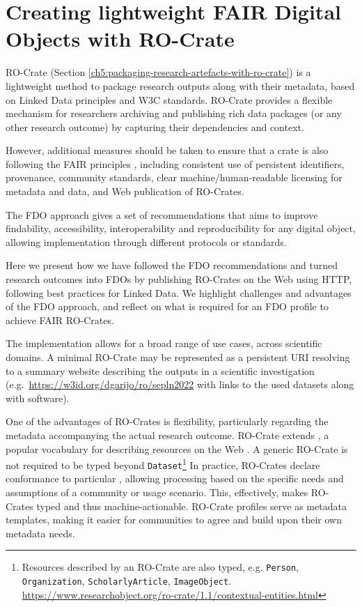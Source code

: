 \section{Creating lightweight FAIR Digital Objects with RO-Crate}
\label{ch4:lightweight-fdo}

RO-Crate \cite{Soiland-Reyes 2022a} (Section \ref{ch5:packaging-research-artefacts-with-ro-crate}) 
is a lightweight method to package research outputs along with
their metadata, based on Linked Data principles
\cite{Bizer 2009} and
W3C standards. RO-Crate provides a flexible mechanism for researchers
archiving and publishing rich data packages (or any other research
outcome) by capturing their dependencies and context.

However, additional measures should be taken to ensure that a crate is
also following the FAIR principles
\cite{Wilkinson 2016},
including consistent use of persistent identifiers, provenance,
community standards, clear machine/human-readable licensing for metadata
and data, and Web publication of RO-Crates.


The 
\acrfull{FDO}
approach
\cite{De Smedt 2020}
gives a set of recommendations that aims to improve findability,
accessibility, interoperability and reproducibility for any digital
object, allowing implementation through different protocols or
standards.

Here we present how we have followed the FDO recommendations and turned
research outcomes into FDOs by publishing RO-Crates on the Web using
HTTP, following best practices for Linked Data. We highlight challenges
and advantages of the FDO approach, and reflect on what is required for
an FDO profile to achieve \acrshort{FAIR} RO-Crates.

The implementation allows for a broad range of use cases, across
scientific domains. A minimal RO-Crate may be represented as a
persistent URI resolving to a summary website describing the outputs in
a scientific investigation
(e.g.~\url{https://w3id.org/dgarijo/ro/sepln2022} with links to the used
datasets along with software).

One of the advantages of RO-Crates is flexibility, particularly
regarding the metadata accompanying the actual research outcome.
RO-Crate extends \cite{schema.org}, a popular
vocabulary for describing resources on the Web
\cite{Guha 2016}. A generic
RO-Crate is not required to be typed beyond \texttt{Dataset}\footnote{
  Resources described by an RO-Crate are also typed, e.g. \texttt{Person}, \texttt{Organization}, \texttt{ScholarlyArticle}, \texttt{ImageObject}. \\
  \url{https://www.researchobject.org/ro-crate/1.1/contextual-entities.html}
}
In practice, RO-Crates declare conformance to particular
,
allowing processing based on the specific needs and assumptions of a
community or usage scenario. This, effectively, makes RO-Crates typed
and thus machine-actionable. RO-Crate profiles serve as metadata
templates, making it easier for communities to agree and build upon
their own metadata needs.

